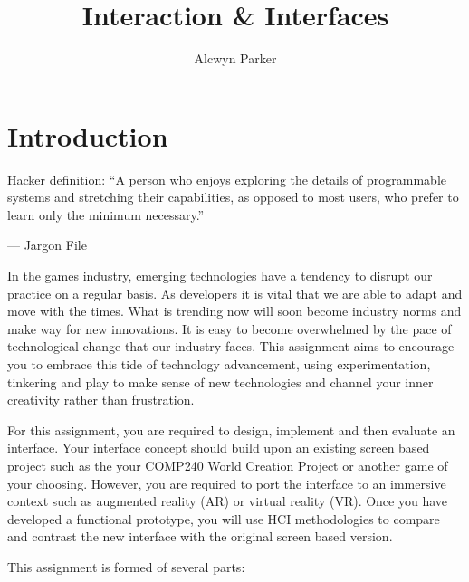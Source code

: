 \documentclass{../../fal_assignment}
\title{Interaction \& Interfaces}
\author{Alcwyn Parker}
\begin{document}
\maketitle

\section*{Introduction}

\begin{marginquote}
Hacker definition: ``A person who enjoys exploring the details of programmable systems and stretching their capabilities, as opposed to most users, who prefer to learn only the minimum necessary.''

--- Jargon File

\end{marginquote}

In the games industry, emerging technologies have a tendency to disrupt our practice on a regular basis. As developers it is vital that we are able to adapt and move with the times. What is trending now will soon become industry norms and make way for new innovations. It is easy to become overwhelmed by the pace of technological change that our industry faces. This assignment aims to encourage you to embrace this tide of technology advancement, using experimentation, tinkering and play to make sense of new technologies and channel your inner creativity rather than frustration. 

For this assignment, you are required to design, implement and then evaluate an interface. Your interface concept should build upon an existing screen based project such as the your COMP240 World Creation Project or another game of your choosing. However, you are required to port the interface to an immersive context such as augmented reality (AR) or virtual reality (VR). Once you have developed a functional prototype, you will use HCI methodologies to compare and contrast the new interface with the original screen based version.  

This assignment is formed of several parts:
\end{document}
